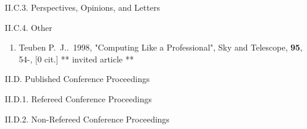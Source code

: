 \documentclass[11pt,letterpaper]{article}
\begin{document}
II.C.3. Perspectives, Opinions, and Letters

II.C.4. Other


\begin{enumerate}[resume,label=\textbf{\arabic*}.]  
\item  Teuben P.~J..\  1998,  "Computing Like a Professional", Sky and 
Telescope,  {\bf 95}, 54-,  [0 cit.] %
** invited article **
  
\end{enumerate}
                

II.D. Published Conference Proceedings

II.D.1. Refereed Conference Proceedings

II.D.2. Non-Refereed Conference Proceedings

\end{document}
